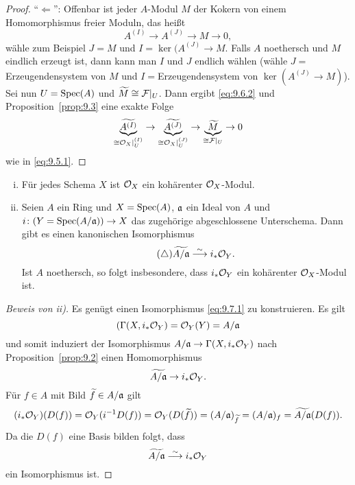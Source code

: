 \begin{prop}
\begin{proof}
		\enquote{$\Longleftarrow$}: Offenbar ist jeder $A$-Modul $M$ der Kokern von einem Homomorphismus freier Moduln, das heißt
		\begin{equation*}
		\label{eq:9.6.2}\tag{$\star\star\star$}
			A^{(I)} \to A^{(J)} \to M \to 0,
		\end{equation*}
		wähle zum Beispiel $J=M$ und $I = \ker(A^{(J)}\to M$. Falls $A$ noethersch und $M$ eindlich erzeugt ist, dann kann man $I$ und $J$ endlich wählen (wähle $J=$Erzeugendensystem von $M$ und $I=$Erzeugendensystem von $\ker(A^{(J)}\to M)$). Sei nun $U=\operatorname{Spec}(A)$ und $\widetilde{M}\cong \mathcal{F}\vert_U$. Dann ergibt \eqref{eq:9.6.2} und Proposition~\ref{prop:9.3} eine exakte Folge
		\[
			\underbrace{\widetilde{A^{(I)}}}_{\cong \mathcal{O}_X\vert_U^{(I)}} \to \underbrace{\widetilde{A^{(J)}}}_{\cong \mathcal{O}_X\vert_U^{(J)}}\to \underbrace{\widetilde{M}}_{\cong \mathcal{F}\vert_U} \to 0
		\]
		wie in \eqref{eq:9.5.1}.
	\end{proof}
\end{prop}

\begin{bsp}
\label{bsp:9.7}
	\begin{enumerate}[i)]
		\item Für jedes Schema $X$ ist $\mathcal{O}_X$ ein kohärenter $\mathcal{O}_X$-Modul.
		\item Seien $A$ ein Ring und $X=\operatorname{Spec}(A)$, $\mathfrak{a}$ ein Ideal von $A$ und $i\colon (Y=\operatorname{Spec}(A/\mathfrak{a}))\to X$ das zugehörige abgeschlossene Unterschema. Dann gibt es einen kanonischen Isomorphismus
		\begin{equation*}
		\label{eq:9.7.1}\tag{$\triangle$}
			\widetilde{A/\mathfrak{a}} \overset{\sim}{\longrightarrow} i_*\mathcal{O}_Y.
		\end{equation*}
		Ist $A$ noethersch, so folgt insbesondere, dass $i_*\mathcal{O}_Y$ ein kohärenter $\mathcal{O}_X$-Modul ist.
	\end{enumerate}
	\begin{proof}[Beweis von ii)]
		Es genügt einen Isomorphismus \eqref{eq:9.7.1} zu konstruieren. Es gilt
		\[
			(\Gamma(X,i_*\mathcal{O}_Y)=\mathcal{O}_Y(Y) =A/\mathfrak{a}
		\]
		und somit induziert der Isomorphismus $A/\mathfrak{a} \to \Gamma(X,i_*\mathcal{O}_Y)$ nach Proposition~\ref{prop:9.2} einen Homomorphismus
		\[
			\widetilde{A/\mathfrak{a}} \to i_*\mathcal{O}_Y.
		\]
		Für $f \in A$ mit Bild $\widetilde{f}\in A/\mathfrak{a}$ gilt
		\[
			(i_*\mathcal{O}_Y)(D(f)) = \mathcal{O}_Y(i^{-1}D(f)) = \mathcal{O}_Y(D(\widetilde{f})) = (A/\mathfrak{a})_{\widetilde{f}} = (A/\mathfrak{a})_f = \widetilde{A/\mathfrak{a}}(D(f)).
		\]
		Da die $D(f)$ eine Basis bilden folgt, dass
		\[
			\widetilde{A/\mathfrak{a}} \overset{\sim}{\longrightarrow} i_*\mathcal{O}_Y
		\]
		ein Isomorphismus ist.
	\end{proof}
\end{bsp}

